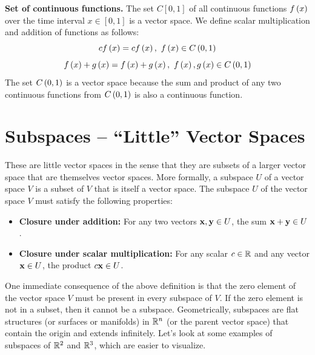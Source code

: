 \begin{boxedstuff}
\begin{example}
    \label{example:polynomial-vector-space}
\end{example}
\begin{example}
    \textbf{Set of continuous functions.} The set $C\left[0, 1\right]$ of all continuous functions $f\left( x\right)$ over the time interval $x \in \left[ 0, 1\right]$ is a vector space. We define scalar multiplication and addition of functions as follows:
    \[ c f\left( x \right) = c f\left( x \right), \,\, f\left( x \right) \in C\left( 0, 1 \right) \]
    \[ f\left( x \right) + g\left( x \right) = f\left( x \right) + g\left( x \right), \,\, f\left( x \right), g\left( x \right) \in C\left( 0, 1 \right) \]
    The set $C\left( 0, 1 \right)$ is a vector space because the sum and product of any two continuous functions from $C\left( 0, 1 \right)$ is also a continuous function.
    \label{example:continuous-function-vector-space}
\end{example}
\end{boxedstuff}

\section{Subspaces -- ``Little'' Vector Spaces}
These are little vector spaces in the sense that they are subsets of a larger vector space that are themselves vector spaces. More formally, a subspace $U$ of a vector space $V$ is a subset of $V$ that is itself a vector space. The subspace $U$ of the vector space $V$ must satisfy the following properties:
\begin{itemize}
    \item \textbf{Closure under addition:} For any two vectors $\mathbf{x}, \mathbf{y} \in U$, the sum $\mathbf{x} + \mathbf{y} \in U$.
    \item \textbf{Closure under scalar multiplication:} For any scalar $c \in \mathbb{R}$ and any vector $\mathbf{x} \in U$, the product $c\mathbf{x} \in U$.
\end{itemize}
One immediate consequence of the above definition is that the zero element of the vector space $V$ must be present in every subspace of $V$. If the zero element is not in a subset, then it cannot be a subspace. Geometrically, subspaces are flat structures (or surfaces or manifolds) in $\mathbb{R}^n$ (or the parent vector space) that contain the origin and extends infinitely. Let's look at some examples of subspaces of $\mathbb{R}^2$ and $\mathbb{R}^3$, which are easier to visualize.


